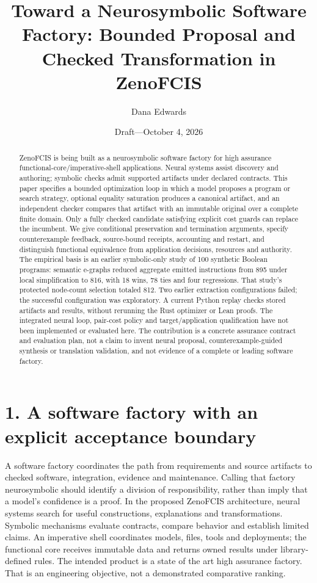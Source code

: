 \documentclass[11pt]{article}
\title{Toward a Neurosymbolic Software Factory: Bounded Proposal and Checked Transformation in ZenoFCIS}
\author{Dana Edwards}
\date{Draft---October 4, 2026}
\begin{document}
\maketitle

\begin{abstract}
ZenoFCIS is being built as a neurosymbolic software factory for high assurance functional-core/imperative-shell applications. Neural systems assist discovery and authoring; symbolic checks admit supported artifacts under declared contracts. This paper specifies a bounded optimization loop in which a model proposes a program or search strategy, optional equality saturation produces a canonical artifact, and an independent checker compares that artifact with an immutable original over a complete finite domain. Only a fully checked candidate satisfying explicit cost guards can replace the incumbent. We give conditional preservation and termination arguments, specify counterexample feedback, source-bound receipts, accounting and restart, and distinguish functional equivalence from application decisions, resources and authority. The empirical basis is an earlier symbolic-only study of 100 synthetic Boolean programs: semantic e-graphs reduced aggregate emitted instructions from 895 under local simplification to 816, with 18 wins, 78 ties and four regressions. That study's protected node-count selection totaled 812. Two earlier extraction configurations failed; the successful configuration was exploratory. A current Python replay checks stored artifacts and results, without rerunning the Rust optimizer or Lean proofs. The integrated neural loop, pair-cost policy and target/application qualification have not been implemented or evaluated here. The contribution is a concrete assurance contract and evaluation plan, not a claim to invent neural proposal, counterexample-guided synthesis or translation validation, and not evidence of a complete or leading software factory.

\end{abstract}

\section{1. A software factory with an explicit acceptance boundary}

A software factory coordinates the path from requirements and source artifacts to checked software, integration, evidence and maintenance. Calling that factory neurosymbolic should identify a division of responsibility, rather than imply that a model's confidence is a proof. In the proposed ZenoFCIS architecture, neural systems search for useful constructions, explanations and transformations. Symbolic mechanisms evaluate contracts, compare behavior and establish limited claims. An imperative shell coordinates models, files, tools and deployments; the functional core receives immutable data and returns owned results under library-defined rules. The intended product is a state of the art high assurance factory. That is an engineering objective, not a demonstrated comparative ranking.
\end{document}
